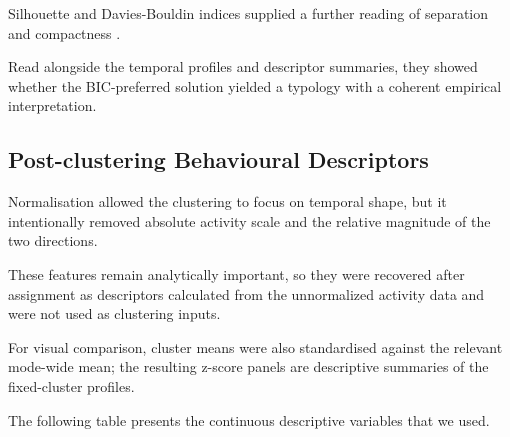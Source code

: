 Silhouette and Davies-Bouldin indices supplied a further reading of separation and compactness \citep{Davies1979,Rousseeuw1987}.

Read alongside the temporal profiles and descriptor summaries, they showed whether the BIC-preferred solution yielded a typology with a coherent empirical interpretation.

\subsection{Post-clustering Behavioural Descriptors}

Normalisation allowed the clustering to focus on temporal shape, but it intentionally removed absolute activity scale and the relative magnitude of the two directions.

These features remain analytically important, so they were recovered after assignment as descriptors calculated from the unnormalized activity data and were not used as clustering inputs.

For visual comparison, cluster means were also standardised against the relevant mode-wide mean; the resulting z-score panels are descriptive summaries of the fixed-cluster profiles.

The following table presents the continuous descriptive variables that we used.

